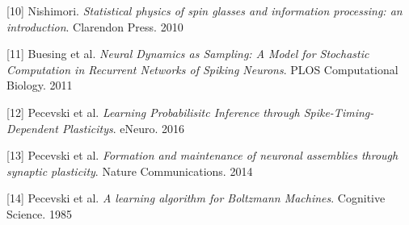 \documentclass{ucetd}
\begin{document}
[10] Nishimori. \textit{Statistical physics of spin glasses and information processing: an introduction}. Clarendon Press. 2010

[11] Buesing et al. \textit{Neural Dynamics as Sampling: A Model for Stochastic Computation in Recurrent Networks of Spiking Neurons}. PLOS Computational Biology. 2011

[12] Pecevski et al. \textit{Learning Probabilisitc Inference through Spike-Timing-Dependent Plasticitys}. eNeuro. 2016

[13] Pecevski et al. \textit{Formation and maintenance of neuronal assemblies through synaptic plasticity}. Nature Communications. 2014

[14] Pecevski et al. \textit{A learning algorithm for Boltzmann Machines}. Cognitive Science. 1985

%
%
\end{document}
